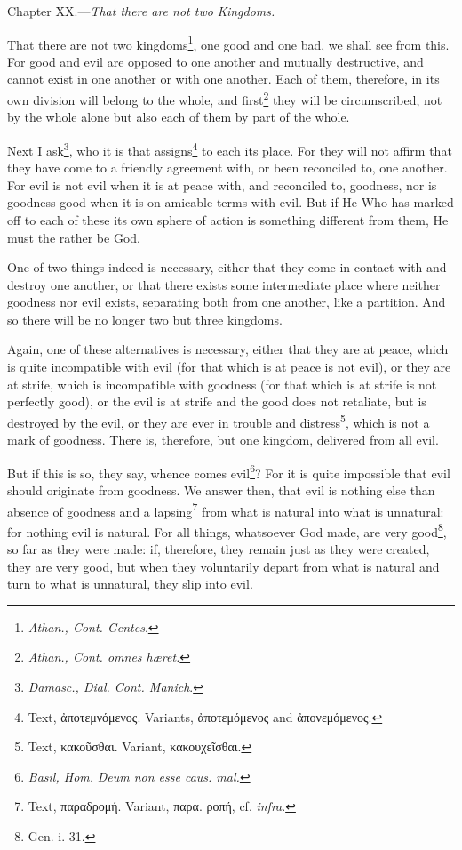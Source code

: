 
Chapter XX.—\emph{That there are not two Kingdoms.}

That there are not two kingdoms\footnote{\emph{Athan., Cont. Gentes}.}, one good and one bad, we shall see from this. For good and evil are opposed to one another and mutually destructive, and cannot exist in one another or with one another. Each of them, therefore, in its own division will belong to the whole, and first\footnote{\emph{Athan., Cont. omnes hæret.}} they will be circumscribed, not by the whole alone but also each of them by part of the whole.

Next I ask\footnote{\emph{Damasc., Dial. Cont. Manich}.}, who it is that assigns\footnote{Text, \textgreek{ἀποτεμνόμενος}. Variants, \textgreek{ἀποτεμόμενος} and \textgreek{ἀπονεμόμενος}.} to each its place. For they will not affirm that they have come to a friendly agreement with, or been reconciled to, one another. For evil is not evil when it is at peace with, and reconciled to, goodness, nor is goodness good when it is on amicable terms with evil. But if He Who has marked off to each of these its own sphere of action is something different from them, He must the rather be God.

One of two things indeed is necessary, either that they come in contact with and destroy one another, or that there exists some intermediate place where neither goodness nor evil exists, separating both from one another, like a partition. And so there will be no longer two but three kingdoms.

Again, one of these alternatives is necessary, either that they are at peace, which is quite incompatible with evil (for that which is at peace is not evil), or they are at strife, which is incompatible with goodness (for that which is at strife is not perfectly good), or the evil is at strife and the good does not retaliate, but is destroyed by the evil, or they are ever in trouble and distress\footnote{Text, \textgreek{κακοῦσθαι}. Variant, \textgreek{κακουχεῖσθαι}.}, which is not a mark of goodness. There is, therefore, but one kingdom, delivered from all evil.

But if this is so, they say, whence comes evil\footnote{\emph{Basil, Hom.} \emph{Deum non esse caus. mal.}}? For it is quite impossible that evil should originate from goodness. We answer then, that evil is nothing else than absence of goodness and a lapsing\footnote{Text, \textgreek{παραδρομή}. Variant, \textgreek{παρα. ροπή}, cf. \emph{infra}.} from what is natural into what is unnatural: for nothing evil is natural. For all things, whatsoever God made, are very good\footnote{Gen. i. 31.}, so far as they were made: if, therefore, they remain just as they were created, they are very good, but when they voluntarily depart from what is natural and turn to what is unnatural, they slip into evil.

